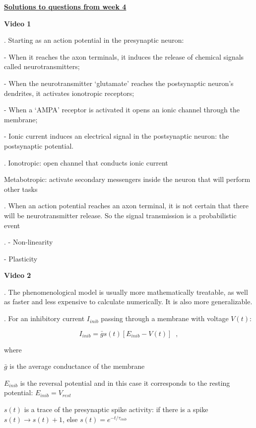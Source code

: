 \documentclass[a4paper,12pt]{article}
\begin{document}
\noindent\large\textbf{\underline{Solutions to questions from week 4}}


\vspace{0.5cm}

\noindent\normalsize\textbf{Video 1}
 

. Starting as an action potential in the presynaptic neuron:

- When it reaches the axon terminals, it induces the release of chemical signals called neurotransmitters;

- When the neurotransmitter `glutamate' reaches the postsynaptic neuron's dendrites, it activates ionotropic receptors;

- When a `AMPA' receptor is activated it opens an ionic channel through the membrane;

- Ionic current induces an electrical signal in the postsynaptic neuron: the postsynaptic potential.

. Ionotropic: open channel that conducts ionic current

Metabotropic: activate secondary messengers inside the neuron that will perform other tasks

. When an action potential reaches an axon terminal, it is not certain that there will be neurotransmitter release. So the signal transmission is a probabilistic event

. - Non-linearity

- Plasticity

\vspace{0.5cm}

\noindent\normalsize\textbf{Video 2}


. The phenomenological model is usually more mathematically treatable, as well as faster and less expensive to calculate numerically. It is also more generalizable.

. For an inhibitory current $I_{inib}$ passing through a membrane with voltage $V(t)$:

$$
I_{inib} = \bar{g}s(t)[E_{inib}-V(t)] \;\;,
$$

where 

$\bar{g}$ is the average conductance of the membrane

$E_{inib}$ is the reversal potential and in this case it corresponds to the resting potential: $E_{inib} = V_{rest}$

$s(t)$ is a trace of the presynaptic spike activity: if there is a spike $s(t) \rightarrow s(t)+1$, else $s(t) = e^{-t/\tau_{inib}}$
\end{document}
